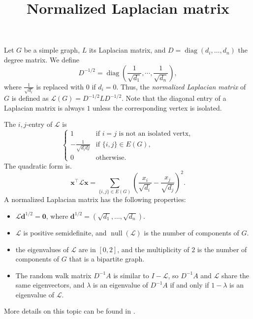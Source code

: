 \documentclass{article}
\title{Normalized Laplacian matrix}
\date{\vspace{-1cm}}
\newcommand{\trans}{^\top}
\newcommand{\bzero}{\mathbf{0}}
\newcommand{\bd}{\mathbf{d}}
\newcommand{\bx}{\mathbf{x}}
\newcommand{\nul}{\operatorname{null}}
\newcommand{\diag}{\operatorname{diag}}
\theoremstyle{definition}
\begin{document}
\maketitle
\large

Let $G$ be a simple graph, $L$ its Laplacian matrix, and $D = \diag(d_i, \ldots, d_n)$ the degree matrix.  We define 
\[D^{-1/2} = \diag(\frac{1}{\sqrt{d_1}}, \cdots, \frac{1}{\sqrt{d_n}}),\]
where $\frac{1}{\sqrt{d_i}}$ is replaced with $0$ if $d_i = 0$.  Thus, the \emph{normalized Laplacian matrix} of $G$ is defined as $\mathcal{L}(G) = D^{-1/2}LD^{-1/2}$.  Note that the diagonal entry of a Laplacian matrix is always $1$ unless the corresponding vertex is isolated.

The $i,j$-entry of $\mathcal{L}$ is 
\[
\begin{cases}
1 & \text{if }i = j\text{ is not an isolated vertx},\\
-\frac{1}{\sqrt{d_idj}} & \text{if }\{i,j\}\in E(G),\\
0 & \text{otherwise}.
\end{cases}
\]
The quadratic form is.
\[\bx\trans\mathcal{L}\bx = \sum_{\{i,j\}\in E(G)} \left(\frac{x_i}{\sqrt{d_i}} - \frac{x_j}{\sqrt{d_j}}\right)^2.\]
A normalized Laplacian matrix has the following properties:  
\begin{itemize}
\item $\mathcal{L}\bd^{1/2} = \bzero$, where $\bd^{1/2} = (\sqrt{d_1}, \ldots, \sqrt{d_n})$. 
\item $\mathcal{L}$ is positive semidefinite, and $\nul(\mathcal{L})$ is the number of components of $G$.
\item the eigenvalues of $\mathcal{L}$ are in $[0,2]$, and the multiplicity of $2$ is the number of components of $G$ that is a bipartite graph.
\item The random walk matrix $D^{-1}A$ is similar to $I - \mathcal{L}$, so $D^{-1}A$ and $\mathcal{L}$ share the same eigenvectors, and $\lambda$ is an eigenvalue of $D^{-1}A$ if and only if $1-\lambda$ is an eigenvalue of $\mathcal{L}$.  
\end{itemize}

More details on this topic can be found in \cite{FRKChung96}.
\end{document}
